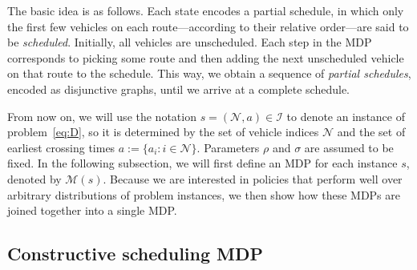 \documentclass[a4paper]{report}
\theoremstyle{definition}
\theoremstyle{plain}
\begin{document}
The basic idea is as follows.
%
Each state encodes a partial schedule, in which only the first few vehicles on
each route---according to their relative order---are said to be
\emph{scheduled}.
%
Initially, all vehicles are unscheduled.
%
Each step in the MDP corresponds to picking some route and then adding the next
unscheduled vehicle on that route to the schedule.
%
This way, we obtain a sequence of \emph{partial schedules}, encoded as
disjunctive graphs, until we arrive at a complete schedule.

From now on, we will use the notation $s = (\mathcal{N}, a) \in \mathcal{I}$ to
denote an instance of problem~\eqref{eq:D}, so it is determined by the set of
vehicle indices $\mathcal{N}$ and the set of earliest crossing times
$a := \{ a_i : i \in \mathcal{N} \}$.
%
Parameters $\rho$ and $\sigma$ are assumed to be fixed.
%
In the following subsection, we will first define an MDP for each instance $s$,
denoted by $\mathcal{M}(s)$.
%
Because we are interested in policies that perform well over arbitrary
distributions of problem instances, we then show how these MDPs are joined
together into a single MDP.


\subsection{Constructive scheduling MDP}\label{sec:MDP}

\end{document}
